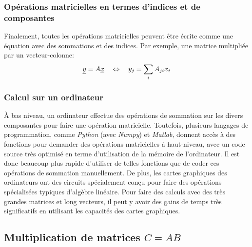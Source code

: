 \subsubsection{Opérations matricielles en termes d'indices et de composantes}
\label{sec:opmatind}

Finalement, toutes les opérations matricielles peuvent être écrite comme une équation avec des sommations et des indices. Par exemple, une matrice multipliée par un vecteur-colonne:
\begin{align}
\underline{y}  = A \underline{x} 
\quad \Leftrightarrow \quad
y_j = \sum_i{A_{ji} x_i }
\end{align}


\subsubsection{Calcul sur un ordinateur}
\label{sec:ordinateur}

À bas niveau, un ordinateur effectue des opérations de sommation sur les divers composantes pour faire une opération matricielle. Toutefois, plusieurs langages de programmation, comme \textit{Python} (avec \textit{Numpy}) et \textit{Matlab}, donnent accès à des fonctions pour demander des opérations matricielles à haut-niveau, avec un code source très optimisé en terme d'utilisation de la mémoire de l'ordinateur. Il est donc beaucoup plus rapide d'utiliser de telles fonctions que de coder ces opérations de sommation manuellement. De plus, les cartes graphiques des ordinateurs ont des circuits spécialement conçu pour faire des opérations spécialisées typiques d'algèbre linéaire. Pour faire des calculs avec des très grandes matrices et long vecteurs, il peut y avoir des gains de temps très significatifs en utilisant les capacités des cartes graphiques.


\newpage
\subsection{Multiplication de matrices $C = A B $}

